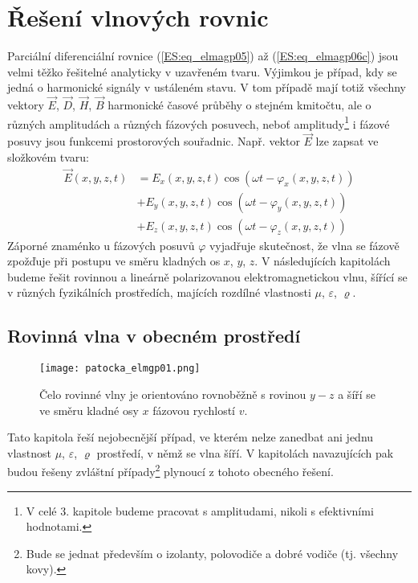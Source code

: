   \section{Řešení vlnových rovnic}
    Parciální diferenciální rovnice (\ref{ES:eq_elmagp05}) až (\ref{ES:eq_elmagp06c}) jsou velmi 
    těžko řešitelné analyticky v uzavřeném tvaru. Výjimkou je případ, kdy se jedná o harmonické 
    signály v ustáleném stavu. V tom případě mají totiž všechny vektory \(\vec{E}\), \(\vec{D}\), 
    \(\vec{H}\), \(\vec{B}\) harmonické časové průběhy o stejném kmitočtu, ale o různých 
    amplitudách a různých fázových posuvech, neboť amplitudy\footnote{V celé 3. kapitole budeme 
    pracovat s amplitudami, nikoli s efektivními hodnotami.} i fázové posuvy jsou funkcemi 
    prostorových souřadnic. Např. vektor \(\vec{E}\) lze zapsat ve složkovém tvaru:
    \begin{align}
     \vec{E}(x,y,z,t) &= E_x(x,y,z,t)\cos(\omega t - \varphi_x(x,y,z,t))  \nonumber   \\
                      &+ E_y(x,y,z,t)\cos(\omega t - \varphi_y(x,y,z,t))  \nonumber   \\
                      &+ E_z(x,y,z,t)\cos(\omega t - \varphi_z(x,y,z,t))  \label{ES:eq_elmagp07} 
    \end{align}
    Záporné znaménko u fázových posuvů \(\varphi\) vyjadřuje skutečnost, že vlna se fázově zpožďuje 
    při postupu ve směru kladných os \(x\), \(y\), \(z\). V následujících kapitolách budeme řešit 
    rovinnou a lineárně polarizovanou elektromagnetickou vlnu, šířící se v různých fyzikálních 
    prostředích, majících rozdílné vlastnosti \(\mu\), \(\varepsilon\), \(\varrho\).
    
    \subsection{Rovinná vlna v obecném prostředí}
    
      \begin{figure}[ht!]
        \centering
        \texttt{[image: patocka\_elmgp01.png]}
        \caption{Čelo rovinné vlny je orientováno rovnoběžně s rovinou \(y-z\) a šíří se ve směru 
                 kladné osy \(x\) fázovou rychlostí \(v\).\cite[s.~70]{Patocka4}}
        \label{ES:fig_elmgp01}
      \end{figure}
      Tato kapitola řeší nejobecnější případ, ve kterém nelze zanedbat ani jednu vlastnost \(\mu\), 
      \(\varepsilon\), \(\varrho\) prostředí, v němž se vlna šíří. V kapitolách navazujících pak 
      budou řešeny zvláštní případy\footnote{Bude se jednat především o izolanty, polovodiče a 
      dobré vodiče (tj. všechny kovy).} plynoucí z tohoto obecného řešení. 
  

